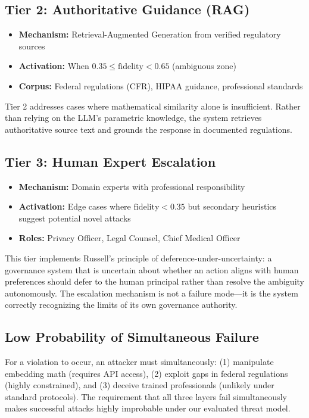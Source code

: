 \documentclass[11pt,twocolumn]{article}
\begin{document}
\subsection{Tier 2: Authoritative Guidance (RAG)}

\begin{itemize}
    \item \textbf{Mechanism:} Retrieval-Augmented Generation from verified regulatory sources
    \item \textbf{Activation:} When $0.35 \leq \text{fidelity} < 0.65$ (ambiguous zone)
    \item \textbf{Corpus:} Federal regulations (CFR), HIPAA guidance, professional standards
\end{itemize}

Tier 2 addresses cases where mathematical similarity alone is insufficient. Rather than relying on the LLM's parametric knowledge, the system retrieves authoritative source text and grounds the response in documented regulations.

\subsection{Tier 3: Human Expert Escalation}

\begin{itemize}
    \item \textbf{Mechanism:} Domain experts with professional responsibility
    \item \textbf{Activation:} Edge cases where $\text{fidelity} < 0.35$ but secondary heuristics suggest potential novel attacks
    \item \textbf{Roles:} Privacy Officer, Legal Counsel, Chief Medical Officer
\end{itemize}

This tier implements Russell's \citep{russell2019human} principle of deference-under-uncertainty: a governance system that is uncertain about whether an action aligns with human preferences should defer to the human principal rather than resolve the ambiguity autonomously. The escalation mechanism is not a failure mode---it is the system correctly recognizing the limits of its own governance authority.

\subsection{Low Probability of Simultaneous Failure}

For a violation to occur, an attacker must simultaneously: (1) manipulate embedding math (requires API access), (2) exploit gaps in federal regulations (highly constrained), and (3) deceive trained professionals (unlikely under standard protocols). The requirement that all three layers fail simultaneously makes successful attacks highly improbable under our evaluated threat model.
\end{document}

